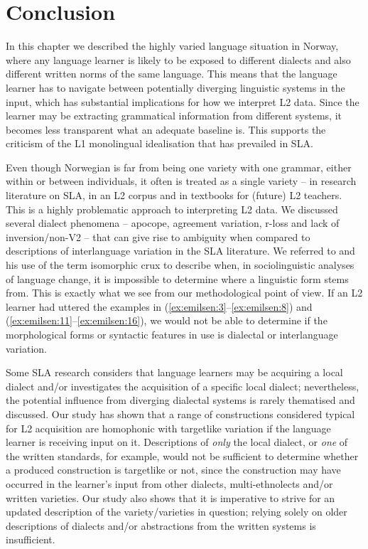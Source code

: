 \documentclass[output=paper,colorlinks,citecolor=brown,modfonts,nonflat]{../langscibook}
\begin{document}
\section{Conclusion}\label{sec:emilsen:4}%

In this chapter we described the highly varied language situation in Norway, where any language learner is likely to be exposed to different dialects and also different written norms of the same language. This means that the language learner has to navigate between potentially diverging linguistic systems in the input, which has substantial implications for how we interpret L2 data. Since the learner may be extracting grammatical information from different systems, it becomes less transparent what an adequate baseline is. This supports the criticism of the L1 monolingual idealisation that has prevailed in SLA. 

Even though Norwegian is far from being one variety with one grammar, either within or between individuals, it often is treated as a single variety – in research literature on SLA, in an L2 corpus and in textbooks for (future) L2 teachers. This is a highly problematic approach to interpreting L2 data. We discussed several dialect phenomena – apocope, agreement variation, r-loss and lack of inversion/non-V2 – that can give rise to ambiguity when compared to descriptions of interlanguage variation in the SLA literature. We referred to \citet{Hårstad2009} and his use of the term isomorphic crux to describe when, in sociolinguistic analyses of language change, it is impossible to determine where a linguistic form stems from. This is exactly what we see from our methodological point of view. If an L2 learner had uttered the examples in (\ref{ex:emilsen:3}--\ref{ex:emilsen:8}) and (\ref{ex:emilsen:11}--\ref{ex:emilsen:16}), we would not be able to determine if the morphological forms or syntactic features in use is dialectal or interlanguage variation. 

Some SLA research considers that language learners may be acquiring a local dialect and/or investigates the acquisition of a specific local dialect; nevertheless, the potential influence from diverging dialectal systems is rarely thematised and discussed. Our study has shown that a range of constructions considered typical for L2 acquisition are homophonic with targetlike variation if the language learner is receiving input on it. Descriptions of \textit{only} the local dialect, or \textit{one} of the written standards, for example, would not be sufficient to determine whether a produced construction is targetlike or not, since the construction may have occurred in the learner’s input from other dialects, multi-ethnolects and/or written varieties. Our study also shows that it is imperative to strive for an updated description of the variety/varieties in question; relying solely on older descriptions of dialects and/or abstractions from the written systems is insufficient.
\end{document}
